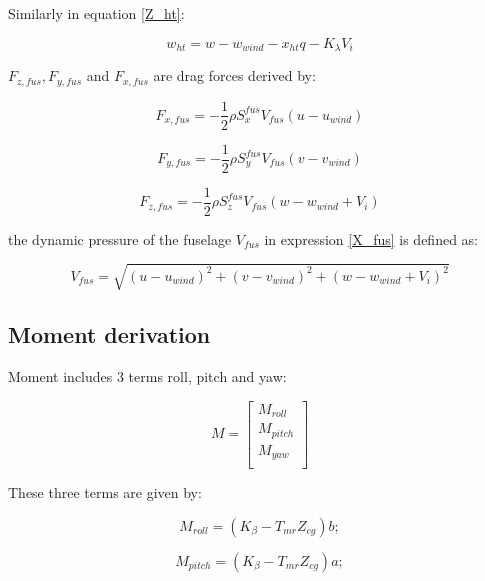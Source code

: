 Similarly in equation \ref{Z_ht}:

\begin{equation}
	w_{ht}=w-w_{wind}-x_{ht}q-K_{\lambda}V_i
\end{equation} 

$F_{z,fus} , F_{y,fus}$ and $F_{x,fus}$ are drag forces derived by:

\begin{equation}
	F_{x,fus}=-\frac{1}{2} \rho S_x^{fus} V_{fus} (u-u_{wind})
	\label{X_fus}
\end{equation}

\begin{equation}\label{Y_fus}
	F_{y,fus}=-\frac{1}{2} \rho S_y^{fus} V_{fus} (v-v_{wind})
\end{equation}

\begin{equation}\label{Z_fus}
	F_{z,fus}=-\frac{1}{2} \rho S_z^{fus} V_{fus} (w-w_{wind}+V_i)
\end{equation}

the dynamic pressure of the fuselage $V_{fus}$ in expression \ref{X_fus} is defined as:

\begin{equation}
	V_{fus}=\sqrt{(u-u_{wind})^2+(v-v_{wind})^2+(w-w_{wind}+V_i)^2}
\end{equation}

\subsection{Moment derivation} \label{Moment section}

Moment includes 3 terms roll, pitch and yaw:

\begin{equation}
	M =\begin{bmatrix}
		M_{roll}\\
		M_{pitch}\\
		M_{yaw}\\
	\end{bmatrix}
\end{equation}

These three terms are given by:

\begin{equation}
	M_{roll} = (K_{\beta}-T_{mr}Z_{cg})b;%
\end{equation}

\begin{equation}
	M_{pitch} = (K_\beta-T_{mr}Z_{cg})a;
\end{equation}

